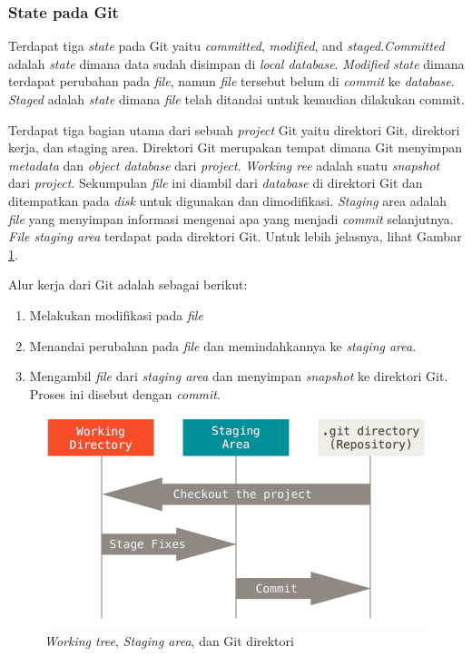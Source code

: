 \subsubsection{State pada Git}
Terdapat tiga \textit{state} pada Git yaitu \textit{committed}, \textit{modified}, and \textit{staged}\cite{chacon2014pro}.\textit{Committed} adalah \textit{state} dimana data sudah disimpan di \textit{local database}. \textit{Modified} \textit{state} dimana terdapat perubahan pada \textit{file}, namun \textit{file} tersebut belum di \textit{commit} ke \textit{database}. \textit{Staged} adalah \textit{state} dimana \textit{file} telah ditandai untuk kemudian dilakukan commit.

Terdapat tiga bagian utama dari sebuah \textit{project} Git yaitu direktori Git, direktori kerja, dan staging area\cite{chacon2014pro}. Direktori Git merupakan tempat dimana Git menyimpan \textit{metadata} dan \textit{object database} dari \textit{project}. \textit{Working ree} adalah suatu \textit{snapshot} dari \textit{project}. Sekumpulan \textit{file} ini diambil dari \textit{database} di direktori Git dan ditempatkan pada \textit{disk} untuk digunakan dan dimodifikasi. \textit{Staging} area adalah \textit{file} yang menyimpan informasi mengenai apa yang menjadi \textit{commit} selanjutnya. \textit{File staging area} terdapat pada direktori Git. Untuk lebih jelasnya, lihat Gambar \ref{fig:git_state}.

Alur kerja dari Git adalah sebagai berikut:
\begin{enumerate}
\item Melakukan modifikasi pada \textit{file}
\item Menandai perubahan pada \textit{file} dan memindahkannya ke \textit{staging area}.
\item Mengambil \textit{file} dari \textit{staging area} dan menyimpan \textit{snapshot} ke direktori Git. Proses ini disebut dengan \textit{commit}.
\end{enumerate}  

\begin{figure}[H]
	\centering
		\includegraphics[scale=0.5]{Gambar/git_state.png}
	\caption{ \textit{Working tree}, \textit{Staging area}, dan Git direktori}
	\label{fig:git_state}
\end{figure}

